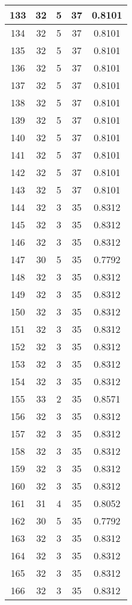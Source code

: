 \documentclass[letterpaper, 12pt]{article}
\begin{document}
\begin{longtable}{|c|c|c|c|c|}
\hline
133 & 32 & 5 & 37 & 0.8101 \\
\hline
134 & 32 & 5 & 37 & 0.8101 \\
\hline
135 & 32 & 5 & 37 & 0.8101 \\
\hline
136 & 32 & 5 & 37 & 0.8101 \\
\hline
137 & 32 & 5 & 37 & 0.8101 \\
\hline
138 & 32 & 5 & 37 & 0.8101 \\
\hline
139 & 32 & 5 & 37 & 0.8101 \\
\hline
140 & 32 & 5 & 37 & 0.8101 \\
\hline
141 & 32 & 5 & 37 & 0.8101 \\
\hline
142 & 32 & 5 & 37 & 0.8101 \\
\hline
143 & 32 & 5 & 37 & 0.8101 \\
\hline
144 & 32 & 3 & 35 & 0.8312 \\
\hline
145 & 32 & 3 & 35 & 0.8312 \\
\hline
146 & 32 & 3 & 35 & 0.8312 \\
\hline
147 & 30 & 5 & 35 & 0.7792 \\
\hline
148 & 32 & 3 & 35 & 0.8312 \\
\hline
149 & 32 & 3 & 35 & 0.8312 \\
\hline
150 & 32 & 3 & 35 & 0.8312 \\
\hline
151 & 32 & 3 & 35 & 0.8312 \\
\hline
152 & 32 & 3 & 35 & 0.8312 \\
\hline
153 & 32 & 3 & 35 & 0.8312 \\
\hline
154 & 32 & 3 & 35 & 0.8312 \\
\hline
155 & 33 & 2 & 35 & 0.8571 \\
\hline
156 & 32 & 3 & 35 & 0.8312 \\
\hline
157 & 32 & 3 & 35 & 0.8312 \\
\hline
158 & 32 & 3 & 35 & 0.8312 \\
\hline
159 & 32 & 3 & 35 & 0.8312 \\
\hline
160 & 32 & 3 & 35 & 0.8312 \\
\hline
161 & 31 & 4 & 35 & 0.8052 \\
\hline
162 & 30 & 5 & 35 & 0.7792 \\
\hline
163 & 32 & 3 & 35 & 0.8312 \\
\hline
164 & 32 & 3 & 35 & 0.8312 \\
\hline
165 & 32 & 3 & 35 & 0.8312 \\
\hline
166 & 32 & 3 & 35 & 0.8312 \\

\end{longtable}
\end{document}
